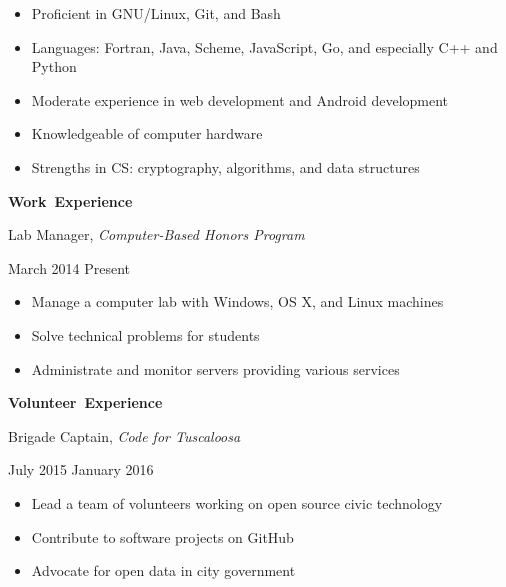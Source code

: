 \documentclass[11pt]{article}
\begin{document}
\begin{itemize}
  \item Proficient in GNU/Linux, Git, and Bash
  \item Languages: Fortran, Java, Scheme, JavaScript, Go, and especially C++ and Python
  \item Moderate experience in web development and Android development
  \item Knowledgeable of computer hardware
  \item Strengths in CS: cryptography, algorithms, and data structures
\end{itemize}

\vspace{1em}
\hbox{\large \textbf{Work Experience}}

\begin{minipage}[t]{0.7\textwidth}
\flushleft
Lab Manager, \textit{Computer-Based Honors Program}\\
\end{minipage}
\begin{minipage}[t]{0.3\textwidth}
\flushright
March 2014 \space \textemdash \space Present\\
\end{minipage}

\begin{itemize}
  \item Manage a computer lab with Windows, OS X, and Linux machines
  \item Solve technical problems for students
  \item Administrate and monitor servers providing various services
\end{itemize}

\vspace{1em}
\hbox{\large \textbf{Volunteer Experience}}

\begin{minipage}[t]{0.7\textwidth}
\flushleft
Brigade Captain, \textit{Code for Tuscaloosa}\\
\end{minipage}
\begin{minipage}[t]{0.3\textwidth}
\flushright
July 2015 \space \textemdash \space January 2016\\
\end{minipage}

\begin{itemize}
  \item Lead a team of volunteers working on open source civic technology
  \item Contribute to software projects on GitHub
  \item Advocate for open data in city government
\end{itemize}
\end{document}
